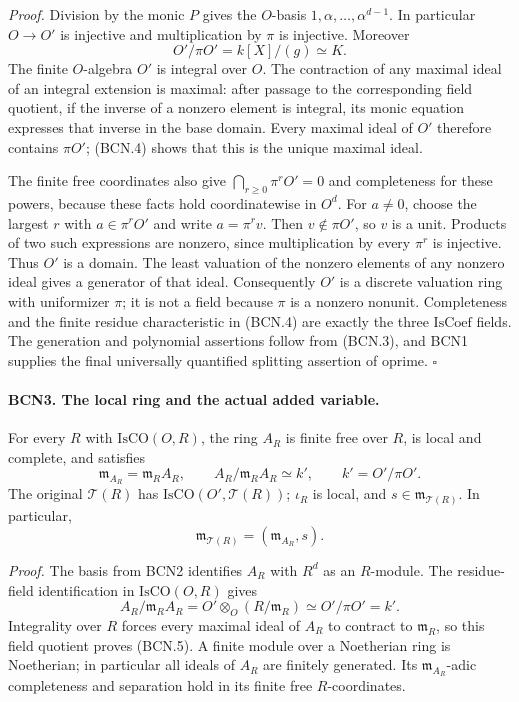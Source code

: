 \emph{Proof.}
Division by the monic \(P\) gives the \(O\)-basis
\(1,\alpha,\ldots,\alpha^{d-1}\).  In particular \(O\to O'\) is
injective and multiplication by \(\pi\) is injective.
Moreover
\[
 O'/\pi O'=k[X]/(g)\simeq K.                       \tag{BCN.4}
\]
The finite \(O\)-algebra \(O'\) is integral over \(O\).
The contraction of any maximal ideal of an integral extension
is maximal: after passage to the corresponding field quotient,
if the inverse of a nonzero element is integral, its monic
equation expresses that inverse in the base domain.
Every maximal ideal of \(O'\) therefore contains \(\pi O'\);
(BCN.4) shows that this is the unique maximal ideal.

The finite free coordinates also give
\(\bigcap_{r\ge0}\pi^rO'=0\) and completeness for these powers,
because these facts hold coordinatewise in \(O^d\).
For \(a\ne0\), choose the largest \(r\) with \(a\in\pi^rO'\)
and write \(a=\pi^r v\).  Then \(v\notin\pi O'\), so \(v\) is
a unit.  Products of two such expressions are nonzero, since
multiplication by every \(\pi^r\) is injective.  Thus \(O'\) is
a domain.  The least valuation of the nonzero elements of any
nonzero ideal gives a generator of that ideal.  Consequently
\(O'\) is a discrete valuation ring with uniformizer \(\pi\);
it is not a field because \(\pi\) is a nonzero nonunit.
Completeness and the finite residue characteristic in (BCN.4)
are exactly the three \(\mathrm{IsCoef}\) fields.  The generation
and polynomial assertions follow from (BCN.3), and BCN1 supplies
the final universally quantified splitting assertion of
\(\mathrm{oprime}\).
\hfill\(\square\)

\paragraph{BCN3. The local ring and the actual added variable.}\label{claim:BCN3}
For every \(R\) with \(\mathrm{IsCO}(O,R)\), the ring \(A_R\)
is finite free over \(R\), is local and complete, and satisfies
\[
 \mathfrak m_{A_R}=\mathfrak m_R A_R,\qquad
 A_R/\mathfrak m_R A_R\simeq k',\qquad
 k'=O'/\pi O'.
 \tag{BCN.5}
\]
The original \(\mathscr T(R)\) has \(\mathrm{IsCO}(O',\mathscr T(R))\);
\(\iota_R\) is local, and \(s\in\mathfrak m_{\mathscr T(R)}\).
In particular,
\[
 \mathfrak m_{\mathscr T(R)}=(\mathfrak m_{A_R},s).
 \tag{BCN.6}
\]

\emph{Proof.}
The basis from BCN2 identifies \(A_R\) with \(R^d\) as an
\(R\)-module.  The residue-field identification in
\(\mathrm{IsCO}(O,R)\) gives
\[
 A_R/\mathfrak m_R A_R
 =O'\otimes_O(R/\mathfrak m_R)\simeq O'/\pi O'=k'.
\]
Integrality over \(R\) forces every maximal ideal of \(A_R\)
to contract to \(\mathfrak m_R\), so this field quotient proves
(BCN.5).  A finite module over a Noetherian ring is Noetherian;
in particular all ideals of \(A_R\) are finitely generated.
Its \(\mathfrak m_{A_R}\)-adic completeness and separation hold
in its finite free \(R\)-coordinates.

